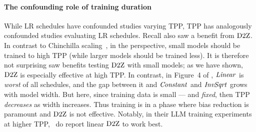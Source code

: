 \paragraph{The confounding role of training duration}\label{subsec:confounding}

While LR schedules have confounded studies varying TPP, TPP has
analogously confounded studies evaluating LR schedules.
%
Recall \citet{kaplan2020scaling} also saw a benefit from $\mbox{D2Z}$.  In
contrast to Chinchilla scaling~\citep{hoffmann2022empirical}, in
the \citeauthor{kaplan2020scaling} perspective, small models should be
trained to high TPP (while larger models should be trained less).  It
is therefore not surprising \citeauthor{kaplan2020scaling} saw
benefits testing $\mbox{D2Z}$ with small models; as we have shown, $\mbox{D2Z}$
is especially effective at high TPP\@.
%
In contrast, in Figure~4 of \citet{yang2022mup}, $\mbox{\emph{Linear}}$
is \emph{worst} of all schedules, and the gap between it and
$\mbox{\emph{Constant}}$ and $\mbox{\emph{InvSqrt}}$ grows with model width.  But here, since
training data is small --- and \emph{fixed}, then TPP
\emph{decreases} as width increases.  Thus training is in a phase
where bias reduction is paramount and $\mbox{D2Z}$ is not effective.
%
Notably, in their LLM training experiments at higher TPP,
\citeauthor{yang2022mup}\ do report linear $\mbox{D2Z}$ to work best.
%
%

